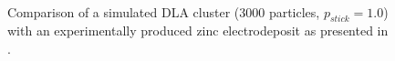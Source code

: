 \documentclass[11pt]{iopart}
\begin{document}
\begin{figure}[t]
    \centering
    \quad \quad \quad \quad \quad \quad \quad
     \\
 
    \caption{Comparison of a simulated DLA cluster (3000 particles, $p_{stick} = 1.0$) with an experimentally produced zinc electrodeposit as presented in \cite{dla}.}
    \label{fig:realcrystal}
\end{figure}
\end{document}

